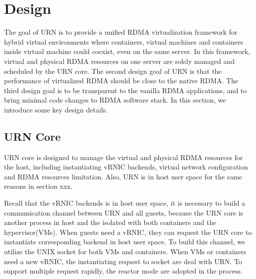 \section{Design}
The goal of URN is to provide a unified RDMA virtualization framework for hybrid virtual environments where containers, virtual machines and containers inside virtual machine could coexist, even on the same server. In this framework, virtual and physical RDMA resources on one server are solely managed and scheduled by the URN core. The second design goal of URN is that the performance of virtualized RDMA should be close to the native RDMA. The third design goal is to be transparent to the vanilla RDMA applications, and to bring minimal code changes to RDMA software stack. In this section, we introduce some key design details.

\subsection{URN Core}
URN core is designed to manage the virtual and physical RDMA resources for the host, including instantiating vRNIC backends, virtual network configuration and RDMA resources limitation. Also, URN is in host user space for the same reasons in section xxx.

Recall that the vRNIC backends is in host user space, it is necessary to build a communication channel between URN and all guests, because the URN core is another process in host and the isolated with both containers and the hypervisor(VMs). When guests need a vRNIC, they can request the URN core to instantiate corresponding backend in host user space. To build this channel, we utilize the UNIX socket for both VMs and containers. When VMs or containers need a new vRNIC, the instantiating request to socket are deal with URN. To support multiple request rapidly, the reactor mode are adopted in the process. 


